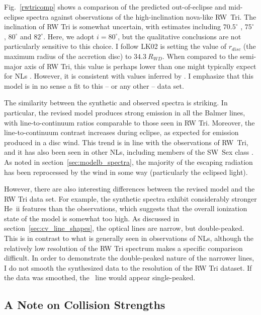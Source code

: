 Fig.~\ref{rwtricomp} shows a comparison of the predicted
out-of-eclipse and mid-eclipse spectra against observations of the
high-inclination nova-like RW~Tri. The inclination of RW Tri is
somewhat uncertain, with estimates including $70.5^\circ$
\citep{smak1995}, $75^\circ$ \citep{groot2004}, $80^\circ$
\citep{longmore1981} and $82^\circ$\citep{frankking1981}. Here, we
adopt $i = 80^\circ$, but the qualitative conclusions are not
particularly sensitive to this choice. 
I follow LK02 is setting the value of $r_{disc}$ (the maximum radius of the accretion disc)
to $34.3~R_{WD}$. When compared to the semi-major axis of RW Tri,
this value is perhaps lower than one might 
typically expect for NLs \citep{harropallinwarner1996}. 
However, it is consistent
with values inferred by \cite{rutten1992}.
I emphasize that this model is in no sense a fit to this -- or any other -- data set.


The similarity between the synthetic and observed spectra is
striking. In particular, the revised model produces strong emission in
all the Balmer lines, with line-to-continuum ratios comparable to
those seen in RW Tri. Moreover, the line-to-continuum contrast
increases during eclipse, as expected for emission produced in a disc
wind. This trend is in line with the observations of RW~Tri, and it
has also been seen in other NLs, including members of the SW~Sex class
\citep{neustroev2011}. As noted in section~\ref{sec:modelb_spectra}, the majority
of the escaping radiation has been reprocessed by the wind in some way
(particularly the eclipsed light).

However, there are also interesting differences between the revised
model and the RW Tri data set. For example, the synthetic spectra exhibit
considerably stronger He~{\sc ii} features than the observations,
which suggests that the overall ionization state of the model is
somewhat too high. As discussed in section~\ref{sec:cv_line_shapes}, 
the optical lines are narrow, but double-peaked. 
This is in contrast to what is generally seen in observations
of NLs, although the relatively low resolution of the RW Tri
spectrum makes a specific comparison difficult. In order to demonstrate
the double-peaked nature of the narrower lines, I do not 
smooth the synthesized data to the resolution of the RW Tri dataset.
If the data was smoothed, the \ha\ line would appear single-peaked.

\subsection{A Note on Collision Strengths}
\label{sec:coll_bl}

